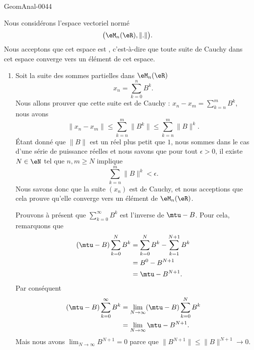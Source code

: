 \begin{corrige}{GeomAnal-0044}

    Nous considérons l'espace vectoriel normé
    \begin{equation}
        \big( \eM_n(\eR),\| . \| \big).
    \end{equation}
    Nous acceptons que cet espace est , c'est-à-dire que toute suite de Cauchy dans cet espace converge vers un élément de cet espace.

    \begin{enumerate}
        \item
            Soit la suite des sommes partielles dans \( \eM_n(\eR)\)
            \begin{equation}
                x_n=\sum_{k=0}^nB^k.
            \end{equation}
            Nous allons prouver que cette suite est de Cauchy : \( x_n-x_m=\sum_{k=n}^{m}B^k\), nous avons
            \begin{equation}
                \| x_n-x_m \|\leq\sum_{k=n}^m\| B^k \|\leq \sum_{k=n}^m\| B \|^k.
            \end{equation}
            Étant donné que \( \| B \|\) est un réel plus petit que \( 1\), nous sommes dans le cas d'une série de puissance réelles et nous savons que pour tout \( \epsilon>0\), il existe \( N\in\eN\) tel que \( n,m\geq N\) implique
            \begin{equation}
                \sum_{k=n}^m\| B \|^k<\epsilon.
            \end{equation}
            Nous savons donc que la suite \( (x_n)\) est de Cauchy, et nous acceptions que cela prouve qu'elle converge vers un élément de \( \eM_n(\eR)\).

            Prouvons à présent que \( \sum_{k=0}^{\infty}B^k\) est l'inverse de \( \mtu-B\). Pour cela, remarquons que
            \begin{subequations}
                \begin{align}
                    (\mtu-B)\sum_{k=0}^NB^k&=\sum_{k=0}^NB^k-\sum_{k=1}^{N+1}B^k\\
                    &=B^0-B^{N+1}\\
                    &=\mtu-B^{N+1}.
                \end{align}
            \end{subequations}
            Par conséquent
            \begin{equation}
                \begin{aligned}[]
                    (\mtu-B)\sum_{k=0}^{\infty}B^k&=\lim_{N\to\infty}(\mtu-B)\sum_{k=0}^NB^k\\
                    &=\lim_{N\to\infty}\mtu-B^{N+1}.
                \end{aligned}
            \end{equation}
            Mais nous avons \( \lim_{N\to\infty}B^{N+1}=0\) parce que \( \| B^{N+1} \|\leq \| B \|^{N+1}\to 0\).


\end{enumerate}
\end{corrige}
